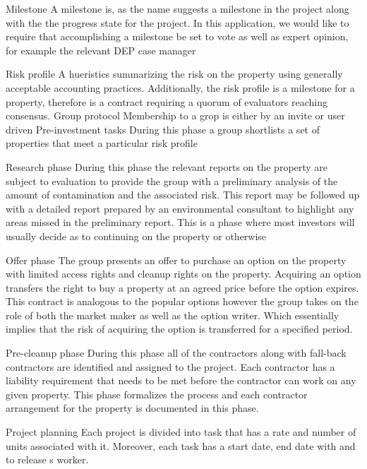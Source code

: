 \documentclass[12pt]{report}
\begin{document}
 Milestone  A milestone is, as the name suggests a milestone in the project along with the the progress state for the project. 
In this application, we would like to require that accomplishing a milestone be set to vote as well as expert opinion, for example 
the relevant DEP case manager

 Risk profile  A hueristics summarizing the risk on the property using generally acceptable accounting practices. Additionally, 
the risk profile is a milestone for a property, therefore is a contract requiring a quorum of evaluators reaching consensus.  Group protocol  Membership to a grop is either by an invite or user driven  Pre-investment tasks  During this phase a group shortlists a set of properties that meet a particular risk profile 

 Research phase  During this phase the relevant reports on the property are subject to evaluation to provide the group with a preliminary analysis
 of the amount of contamination and the associated risk. This report may be followed up with a detailed report prepared by an 
environmental consultant to highlight any areas missed in the preliminary report. This is a phase where most investors will usually decide 
as to continuing on the property or otherwise

 Offer phase  The group presents an offer to purchase an option on the property with limited access rights and cleanup rights on the property. Acquiring an option transfers the right to 
buy a property at an agreed price before the option expires. This contract is analogous to the 
popular options however the group takes on the role of both the market maker as well as the 
option writer. Which essentially implies that the risk of acquiring the option is transferred for a specified period. 

 Pre-cleanup phase  During this phase all of the contractors along with fall-back contractors are identified 
and assigned to the project. Each contractor has a liability requirement that needs to be met before the contractor can work on any given property. This phase formalizes the process and each contractor arrangement for the property is documented in this phase. 


 Project planning  Each project is divided into task that has a rate and number of units associated with it. Moreover, each task has a start date, end date with  and  to release s worker.
\end{document}
